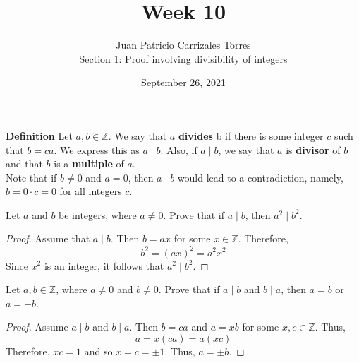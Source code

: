 \documentclass[12pt]{article}
\newcommand{\Z}{\mathbb{Z}}
\newenvironment{problem}[2][Problem]{\begin{trivlist}
		\item[\hskip \labelsep {\bfseries #1}\hskip \labelsep {\bfseries #2.}]}{\end{trivlist}}
\begin{document}
	
	\title{Week 10}
	\author{Juan Patricio Carrizales Torres \\
		Section 1: Proof involving divisibility of integers}
	\date{September 26, 2021}
	\maketitle
	
	\textbf{Definition} Let $a,b\in \Z$. We say that $a$ \textbf{divides} b if there is some integer $c$ such that $b=ca$. We express this as $a\mid b$. Also, if $a\mid b$, we say that $a$ is \textbf{divisor} of $b$ and that $b$ is a \textbf{multiple} of $a$.\\
	Note that if $b\neq 0$ and $a=0$, then $a\mid b$ would lead to a contradiction, namely, $b=0\cdot c= 0$ for all integers $c$.
	
	\begin{problem}{1}
		Let $a$ and $b$ be integers, where $a\neq 0$. Prove that if $a\mid b$, then $a^{2}\mid b^{2}$.
	\begin{proof}
		Assume that $a\mid b$. Then $b=ax$ for some $x\in \Z$. Therefore,
		\begin{equation*}
			b^{2} = (ax)^{2}=a^{2}x^{2}
		\end{equation*}
		Since $x^{2}$ is an integer, it follows that $a^{2}\mid b^{2}$.
	\end{proof}
	\end{problem}

	\begin{problem}{2}
		Let $a,b \in \Z$, where $a\neq 0$ and $b\neq 0$. Prove that if $a \mid b$ and $b \mid a$, then $a=b$ or $a=-b$.
		\begin{proof}
			Assume $a \mid b$ and $b \mid a$. Then $b=ca$ and $a=xb$ for some $x,c\in \Z$. Thus,
			\begin{equation*}
				a = x(ca) = a(xc)
			\end{equation*}
		Therefore, $xc = 1$ and so $x=c=\pm 1$. Thus, $a=\pm b$.
		\end{proof}
	\end{problem}
\end{document}

